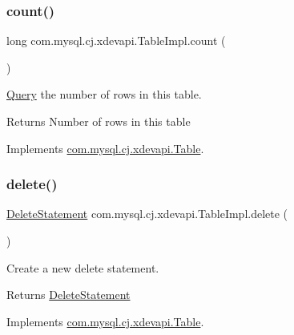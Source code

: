 \subsubsection{\texorpdfstring{count()}{count()}}
{\footnotesize\ttfamily long com.\+mysql.\+cj.\+xdevapi.\+Table\+Impl.\+count (\begin{DoxyParamCaption}{ }\end{DoxyParamCaption})}

\mbox{\hyperlink{interfacecom_1_1mysql_1_1cj_1_1_query}{Query}} the number of rows in this table.

\begin{DoxyReturn}{Returns}
Number of rows in this table 
\end{DoxyReturn}


Implements \mbox{\hyperlink{interfacecom_1_1mysql_1_1cj_1_1xdevapi_1_1_table_a4f0524bd76d54d6b053187ea09ab2956}{com.\+mysql.\+cj.\+xdevapi.\+Table}}.

\mbox{\label{classcom_1_1mysql_1_1cj_1_1xdevapi_1_1_table_impl_ab12665d608984e6774957947f6a22c7c}} 
\subsubsection{\texorpdfstring{delete()}{delete()}}
{\footnotesize\ttfamily \mbox{\hyperlink{interfacecom_1_1mysql_1_1cj_1_1xdevapi_1_1_delete_statement}{Delete\+Statement}} com.\+mysql.\+cj.\+xdevapi.\+Table\+Impl.\+delete (\begin{DoxyParamCaption}{ }\end{DoxyParamCaption})}

Create a new delete statement.

\begin{DoxyReturn}{Returns}
\mbox{\hyperlink{interfacecom_1_1mysql_1_1cj_1_1xdevapi_1_1_delete_statement}{Delete\+Statement}} 
\end{DoxyReturn}


Implements \mbox{\hyperlink{interfacecom_1_1mysql_1_1cj_1_1xdevapi_1_1_table_a52be4284a88e0a4f243580be570018e2}{com.\+mysql.\+cj.\+xdevapi.\+Table}}.

\mbox{\label{classcom_1_1mysql_1_1cj_1_1xdevapi_1_1_table_impl_aa51ee706e090fe9acd2e81c313e5a6eb}} 
